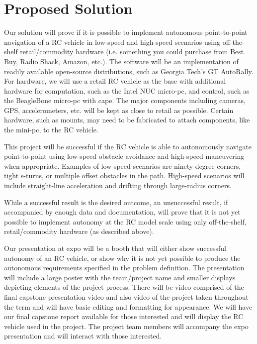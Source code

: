 \documentclass[draftclsnofoot,onecolumn,10pt]{IEEEtran}
\begin{document}
\section{Proposed Solution}
Our solution will prove if it is possible to implement autonomous point-to-point
navigation of a RC vehicle in low-speed and high-speed scenarios using
off-the-shelf retail/commodity hardware (i.e. something you could purchase from
Best Buy, Radio Shack, Amazon, etc.).  The software will be an implementation of
readily available open-source distributions, such as Georgia Tech's GT
AutoRally. For hardware, we will use a retail RC vehicle as the base with
additional hardware for computation, such as the Intel NUC micro-pc, and
control, such as the BeagleBone micro-pc with cape. The major components including
cameras, GPS, accelerometers, etc. will be kept as close to retail as possible.
Certain hardware, such as mounts, may need to be fabricated to attach
components, like the mini-pc, to the RC vehicle.\par
This project will be successful if the RC vehicle is able to autonomously
navigate point-to-point using low-speed obstacle avoidance and high-speed
maneuvering when appropriate. Examples of low-speed scenarios are ninety-degree
corners, tight s-turns, or multiple offset obstacles in the path. High-speed
scenarios will include straight-line acceleration and drifting through
large-radius corners.\par
While a successful result is the desired outcome, an unsuccessful result, if 
accompanied by enough data and documentation, will prove that it is not yet 
possible to implement autonomy at the RC model scale using only off-the-shelf, 
retail/commodity hardware (as described above).\par
Our presentation at expo will be a booth that will either show successful
autonomy of an RC vehicle, or show why it is not yet possible to produce the
autonomous requirements specified in the problem definition. The presentation
will include a large poster with the team/project name and smaller displays
depicting elements of the project process. There will be video comprised of the
final capstone presentation video and also video of the project taken throughout
the term and will have basic editing and formatting for appearance. We will have
our final capstone report available for those interested and will display the RC
vehicle used in the project. The project team members will accompany the expo
presentation and will interact with those interested.
\end{document}
